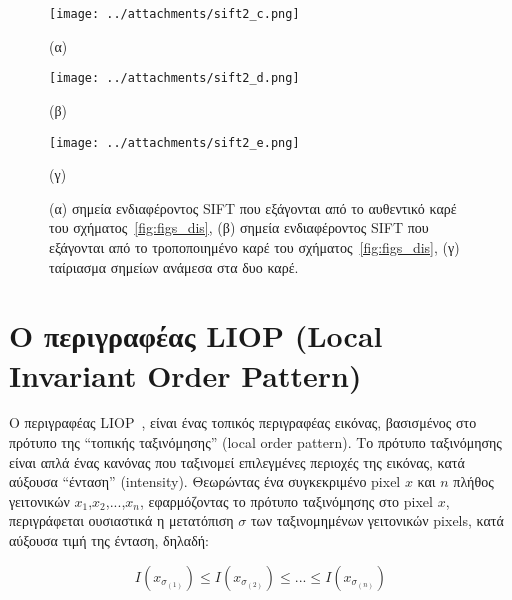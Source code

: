  \newpage
 


 
\begin{figure}[!ht]
\begin{minipage}[b]{0.5\linewidth}
\centering
\texttt{[image: ../attachments/sift2\_c.png]}
\caption*{(α)}
\label{fig:sift_4}
\end{minipage}
\hspace{0.9cm}
\begin{minipage}[b]{0.5\linewidth}
\centering
\texttt{[image: ../attachments/sift2\_d.png]}
\caption*{(β)}
\label{fig:sift_5}
\end{minipage}

\end{figure} 
 

\begin{figure}[!h]
\begin{minipage}[b]{1.0\linewidth}
\centering
\texttt{[image: ../attachments/sift2\_e.png]}
\caption*{(γ)}
\label{fig:sift_6}
\end{minipage}
\caption{(α) σημεία ενδιαφέροντος SIFT που εξάγονται από το αυθεντικό καρέ του σχήματος~\ref{fig:figs_dis},
(β) σημεία ενδιαφέροντος SIFT που εξάγονται από το τροποποιημένο καρέ του σχήματος~\ref{fig:figs_dis}, (γ) ταίριασμα σημείων ανάμεσα στα δυο καρέ.}
 \label{fig:sift_dis_figs}
 \end{figure} 
 

 
 \newpage  %


\section{Ο περιγραφέας LIOP (Local Invariant Order Pattern)}
 \vspace{1.5cm}
 
Ο περιγραφέας LIOP~\cite{wang2011local}, είναι ένας τοπικός περιγραφέας εικόνας, βασισμένος στο πρότυπο της ``τοπικής ταξινόμησης'' (local order pattern).
Το πρότυπο ταξινόμησης είναι απλά ένας κανόνας που ταξινομεί επιλεγμένες περιοχές της εικόνας, κατά αύξουσα ``ένταση'' (intensity).
Θεωρώντας ένα συγκεκριμένο pixel $x$ και $n$ πλήθος γειτονικών $x_1$,$x_2$,$...$,$x_n$, εφαρμόζοντας το πρότυπο ταξινόμησης στο pixel $x$, περιγράφεται ουσιαστικά η μετατόπιση $\sigma$
των ταξινομημένων γειτονικών pixels, κατά αύξουσα τιμή της ένταση, δηλαδή:

\begin{equation*}
  I(x_{\sigma_{(1)}})\leq I(x_{\sigma_{(2)}})\leq...\leq I(x_{\sigma_{(n)}})
\end{equation*}

